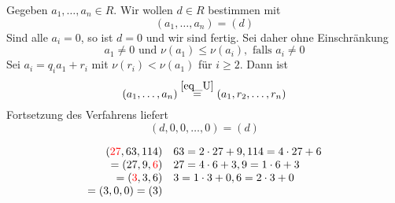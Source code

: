 	Gegeben $a_1,\dots,a_n \in R$. Wir wollen $d \in R$ bestimmen mit 
	\[ (a_1,\dots,a_n) = (d) \]
	Sind alle $a_i = 0$, so ist $d = 0$ und wir sind fertig. Sei daher ohne Einschränkung
	\[ a_1 \neq 0 \text{ und } \nu(a_1) \leq \nu(a_i), \text{ falls } a_i \neq 0 \]
	Sei $a_i = q_ia_1 + r_i$ mit $\nu(r_i) < \nu(a_1)$ für $i \geq 2$. Dann ist
	\[ (a_1,\dots,a_n) \stackrel{\eqref{eq_U}}{=} (a_1,r_2,\dots,r_n) \]
	Fortsetzung des Verfahrens liefert
	\[ (d,0,0,\dots,0) = (d) \]
	
\[\begin{array}{rl}
	(\textcolor{red}{27},63,114) & 63 = 2 \cdot 27 + 9, 114 = 4 \cdot 27 + 6 \\ 
	= (27,9,\textcolor{red}{6}) & 27 = 4 \cdot 6 + 3, 9 = 1 \cdot 6 + 3 \\ 
	= (\textcolor{red}{3},3,6) & 3 = 1 \cdot 3 + 0, 6 = 2 \cdot 3 + 0 \\ 
	= (3, 0, 0) = (3) & 
\end{array}\]
\newpage